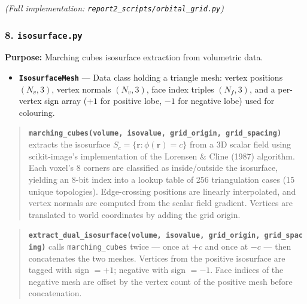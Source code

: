 \documentclass[
  11pt,
]{report}
\providecommand{\tightlist}{%
  \setlength{\itemsep}{0pt}\setlength{\parskip}{0pt}}
\begin{document}
\emph{(Full implementation: \texttt{report2\_scripts/orbital\_grid.py})}

\subsubsection{\texorpdfstring{8.
\texttt{isosurface.py}}{8. isosurface.py}}\label{isosurface.py}

\textbf{Purpose:} Marching cubes isosurface extraction from volumetric
data.

\begin{itemize}
\tightlist
\item
  \textbf{\texttt{IsosurfaceMesh}} --- Data class holding a triangle
  mesh: vertex positions \((N_v, 3)\), vertex normals \((N_v, 3)\), face
  index triples \((N_f, 3)\), and a per-vertex sign array (\(+1\) for
  positive lobe, \(-1\) for negative lobe) used for colouring.
\end{itemize}

\begin{quote}
\textbf{\texttt{marching\_cubes(volume,\ isovalue,\ grid\_origin,\ grid\_spacing)}}
extracts the isosurface \(S_c = \{\mathbf{r} : \phi(\mathbf{r}) = c\}\)
from a 3D scalar field using scikit-image's implementation of the
Lorensen \& Cline (1987) algorithm. Each voxel's 8 corners are
classified as inside/outside the isosurface, yielding an 8-bit index
into a lookup table of 256 triangulation cases (15 unique topologies).
Edge-crossing positions are linearly interpolated, and vertex normals
are computed from the scalar field gradient. Vertices are translated to
world coordinates by adding the grid origin.
\end{quote}

\begin{quote}
\textbf{\texttt{extract\_dual\_isosurface(volume,\ isovalue,\ grid\_origin,\ grid\_spacing)}}
calls \texttt{marching\_cubes} twice --- once at \(+c\) and once at
\(-c\) --- then concatenates the two meshes. Vertices from the positive
isosurface are tagged with sign \(= +1\); negative with sign \(= -1\).
Face indices of the negative mesh are offset by the vertex count of the
positive mesh before concatenation.
\end{quote}
\end{document}
